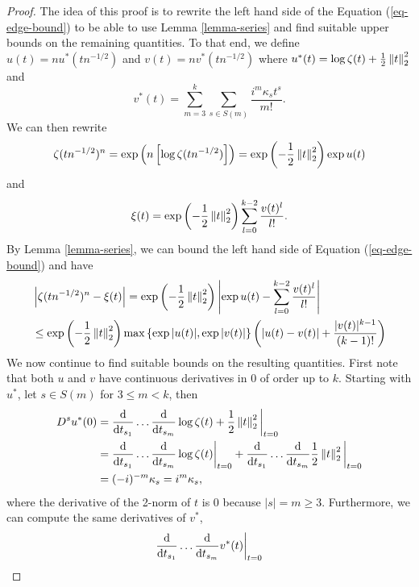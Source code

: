 \begin{proof}
    The idea of this proof is to rewrite the left hand side of the Equation (\ref{eq-edge-bound}) to be able to use Lemma \ref{lemma-series} and find suitable upper bounds on the remaining quantities. To that end, we define $u(t) = n u^*(t n^{-1/2})$ and $v(t) = nv^*(t n^{-1/2})$ where $u^*(t) = \log \zeta(t) + \frac{1}{2}\left\lVert t\right\rVert_2^2$ and 
    \begin{equation*}
        v^*(t) = \sum_{m=3}^k \sum_{s \in S(m)} \frac{i^m\kappa_s t^s}{m!}.
    \end{equation*}
    We can then rewrite
    \begin{equation*}
        \zeta(t n^{-1/2})^n = \exp\left(n\left[\log \zeta(t n^{-1/2})\right]\right) = \exp\left(-\frac{1}{2}\left\lVert t\right\rVert_2^2\right)\exp u(t)
    \end{equation*}
    and
    \begin{equation*}
        \xi(t) = \exp\left(-\frac{1}{2}\left\lVert t\right\rVert_2^2\right)\sum_{l=0}^{k-2} \frac{v(t)^l}{l!}.
    \end{equation*}
    By Lemma \ref{lemma-series}, we can bound the left hand side of Equation (\ref{eq-edge-bound}) and have
    \begin{align*}
        &\left|\zeta(t n^{-1/2})^n - \xi(t)\right| 
        = \exp\left(-\frac{1}{2}\left\lVert t\right\rVert_2^2\right)\left|\exp u(t) - \sum_{l=0}^{k-2} \frac{v(t)^l}{l!}\right|\\
        &\leq \exp\left(-\frac{1}{2}\left\lVert t\right\rVert_2^2\right) \max \left\{ \exp{|u(t)|}, \exp{|v(t)|} \right\}\left(\left|u(t) - v(t)\right| + \frac{|v(t)|^{k-1}}{(k-1)!}\right)
    \end{align*}
    We now continue to find suitable bounds on the resulting quantities. First note that both $u$ and $v$ have continuous derivatives in 0 of order up to $k$. Starting with $u^*$, let $s \in S(m)$ for $3 \leq m < k$, then
    \begin{align*}
        D^s u^*(0)
        &= \frac{\text{d}}{\text{d} t_{s_1}}\ldots\frac{\text{d}}{\text{d} t_{s_m}} \log \zeta(t) + \frac{1}{2}\left\lVert t\right\rVert_2^2\bigg|_{t=0}\\
        &=  \frac{\text{d}}{\text{d} t_{s_1}}\ldots\frac{\text{d}}{\text{d} t_{s_m}} \log \zeta(t)\bigg|_{t=0}
            +
            \frac{\text{d}}{\text{d} t_{s_1}}\ldots\frac{\text{d}}{\text{d} t_{s_m}} \frac{1}{2}\left\lVert t\right\rVert_2^2\bigg|_{t=0}
        \\
        &= (-i)^{-m}\kappa_s = i^m \kappa_s ,
    \end{align*}
    where the derivative of the 2-norm of $t$ is 0 because $|s| = m \geq 3$. Furthermore, we can compute the same derivatives of $v^*$,
    \begin{align*}
        \ddx{t_{s_1}}\ldots\ddx{t_{s_m}} v^*(t) \bigg|_{t=0}

\end{align*}
\end{proof}
